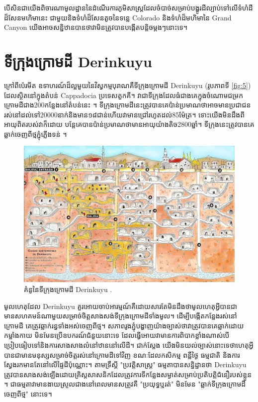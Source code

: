 \documentclass[10pt,twocolumn,letterpaper]{article}
\begin{document}
បើសិនជាយើងពិចារណាមូលដ្ឋាននៃដំណើរការភូមិសាស្ត្រដែលចំបាច់សម្រាប់បង្ហូរដីល្បាប់ទៅលើទំហំដីដ៏សែនមហិមានេះ ជាមួយនិងទំហំដ៏សែនតូចនៃទន្លេ Colorado និងទំហំដ៏មហិមានៃ Grand Canyon យើងអាចសន្និឋានបានថាវាមិនត្រូវបានបង្កើតបន្តិចម្តងៗនោះទេ។

\section{ទីក្រុងក្រោមដី Derinkuyu}

ក្រៅពីប៉េរមីត ឧទាហរណ៍ដ៏ល្អមួយនៃវិស្វកម្មបុរាណគឺទីក្រុងក្រោមដី Derinkuyu (រូបភាពទី \ref{fig:5}) ដែលស្ថិតនៅក្នុងតំបន់ Cappadocia ប្រទេសតួកគី។ វាជាទីក្រុងដែលធំជាងគេក្នុងចំណោមជម្រកក្រោមដីជាង200កន្លែងនៅតំបន់នេះ \cite{54}។ ទីក្រុងក្រោមដីនេះត្រូវបានគេប៉ាន់ប្រមាណថាអាចមានប្រជាជនរស់នៅដល់ទៅ20000នាក់និងមាន១៨ជាន់ហើយវាមានជ្រៅរហូតដល់85ម៉ែត្រ។ ទោះយើងមិនដឹងពីអាយុពិតរបស់វាក៏ដោយ បន្តែគេបានប៉ាន់ប្រមាណថាមានអាយុយ៉ាងតិច2800ឆ្នាំ។ ទីក្រុងនេះត្រូវបានគេឆ្លាក់ចេញពីថ្មភ្នុំភ្លើងទន់ \cite{52, 53}។

\begin{figure}[b]
\begin{center}

   \includegraphics[width=1\linewidth]{derinkuyu.jpeg}
\end{center}
   \caption{គំនូនៃទីក្រុងក្រោមដី Derinkuyu \cite{56}.}
\label{fig:5}
\label{fig:onecol}
\end{figure}

មូលហេតុដែល Derinkuyu គួរអោយចាប់អារម្មណ៍គឺដោយសារតែមិនដឹងថាមូលហេតុអ្វីបានជាមានសហគមន៍ណាមួយសម្រាច់ចិត្តសាងសង់ទីក្រុងក្រោមដីទាំងមូល។ ដើម្បីបង្កើតកន្លែងរស់នៅក្រោមដី គេត្រូវឆ្លាក់រន្ធទាំងអស់ចេញពីថ្ម។ សភាពរូងភ្នុំបង្ហាញយ៉ាងច្បាស់ថាវាត្រូវបានគេឆ្លាក់ដោយកម្លាំងកាយ មិនមែនប្រើឧបករណ៍ជំនួយនោះទេ ដែលធ្វើអោយវាមានការពិបាកខ្លាំងណាស់បើប្រៀបធៀបទៅនិងការសាងសាងលំនៅឋាននៅលើដី។ ជាក់ស្តែង យើងមិនយល់ច្បាស់នោះទេថាហេតុអ្វីបានជាមានមនុស្សសម្រាច់ចិត្តរស់នៅក្រោមដីទៅវិញ ខណៈដែលកសិកម្ម ពន្លឺថ្ងៃ ធម្មជាតិ និងការស្វែងរកមានតែនៅលើផ្ទៃដីប៉ុណ្ណោះ។ តាមទ្រឹស្តី "ប្រវត្តិសាស្រ្ត" ធម្មតាបានសន្និដ្ឋានថា Derinkuyu ត្រូវបានសាងសង់ឡើងដោយគ្រិស្ដសាសនិកដែលត្រូវការទីកន្លែងសម្ងាត់សម្រាប់ប្រតិបត្តិជំនឿរបស់ខ្លួន \cite{53}។ ជាធម្មតាវាមានងាយស្រួលជាងនៅពេលមានសត្រូវគឺ "ប្រយុទ្ធឬរត់" មិនមែន "ឆ្លាក់ទីក្រុងក្រោមដីចេញពីថ្ម" នោះទេ។
\end{document}
